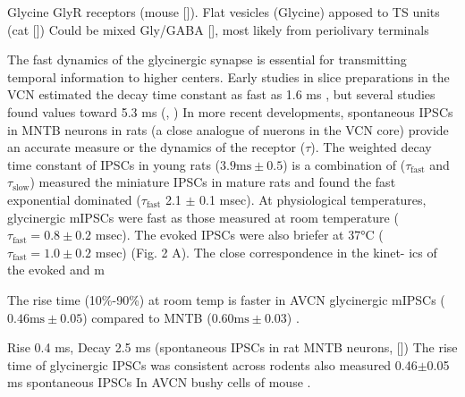 Glycine GlyR receptors (mouse []).
Flat vesicles (Glycine) apposed to TS units (cat [])
Could be mixed Gly/GABA [], most likely from periolivary terminals

The fast dynamics of the glycinergic synapse is essential for transmitting
temporal information to higher centers.  Early studies in slice preparations in
the VCN estimated the decay time constant as fast as 1.6 ms
, but several studies found values toward 5.3 ms
(\citep*[mouse][]{OertelWickesberg:1993,WickesbergOertel:1993}, \citep*[guinea
pig VCN][]{HartyManis:1998}) In more recent developments, spontaneous IPSCs in
MNTB neurons in rats (a close analogue of nuerons in the VCN core) provide an
accurate measure or the dynamics of the receptor ($\tau$). The weighted decay
time constant of IPSCs in young rats ($3.9 \mathrm{ms} \pm 0.5$) is a
combination of ($\tau_{\textrm{fast}}$ and $\tau_{\textrm{slow}}$)
\citet{AwatramaniTurecekEtAl:2004} measured the miniature IPSCs in mature rats
and found the fast exponential dominated ($\tau_{\textrm{fast}}$ 2.1 $\pm$ 0.1
msec).  
At physiological temperatures, glycinergic mIPSCs were fast as those measured at
room temperature ($\tau_{\textrm{fast}}=0.8 \pm 0.2$ msec). The evoked IPSCs
were also briefer at 37°C ($\tau_{\textrm{fast}}=1.0 \pm 0.2$ msec) (Fig. 2
A). The close correspondence in the kinet- ics of the evoked and m

The rise time (10\%-90\%) at room temp is faster in AVCN glycinergic mIPSCs
($0.46 \mathrm{ms} \pm 0.05$) compared to MNTB ($0.60 \mathrm{ms} \pm 0.03$)
\citep{LimOleskevichEtAl:2003}.

Rise 0.4 ms, Decay 2.5 ms (spontaneous IPSCs in rat MNTB neurons,
[]) The rise time of glycinergic IPSCs was
consistent across rodents also measured 0.46$\pm$0.05 ms spontaneous IPSCs In
AVCN bushy cells of mouse \citep{LimOleskevichEtAl:2003}.


